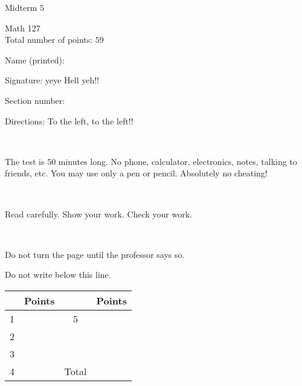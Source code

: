 \documentclass{article}
\begin{document}
\renewcommand{\headrulewidth}{0pt}
\fontsize{11}{18}\selectfont
\begin{center}
\begin{bfseries}
\noindent \Large{Midterm $5$} \\ 
\end{bfseries} 
\vspace{0.3cm}
\large{Math 127} \\
\large{Total number of points: $59$}
\end{center}

\begin{center}
Name (printed): \underline{\hspace{4in}}
 

 
Signature: \underline{\hspace{4in}}
yeye Hell yeh!!

 
Section number: \underline{\hspace{1in}}
 
 
\end{center}

\normalsize

\vfill

Directions:  To the left, to the left!!

\

The test is $50$ minutes long. No phone, calculator, electronics, notes, talking to friends, etc. You may use only a pen or pencil. Absolutely no cheating!

\


Read carefully. Show your work. Check your work.

\

Do not turn the page until the professor says so.
\vfill

\large
Do not write below this line. 


\noindent\makebox[\linewidth]{\rule{\paperwidth}{0.4pt}}

\vfill

\huge
{%
\begin{center}
\begin{tabular}{| c | c | c | c |}
\hline
  & Points &  & Points \\ \hline
1 &  & 5 & \\ \hline
2 &  &  & \\ \hline
3 &  &  & \\ \hline
4 &  & Total & \\ \hline 
\end{tabular}
\end{center}
}%
\end{document}
